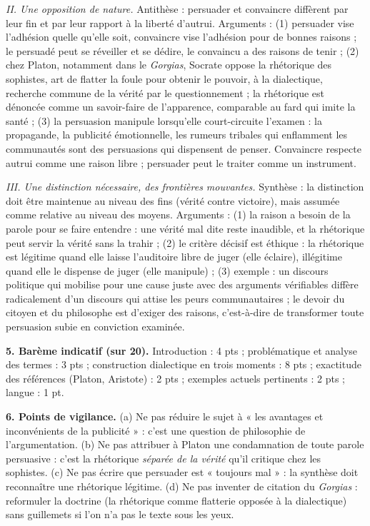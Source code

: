 \documentclass[11pt]{article}
\begin{document}
\begin{corrige}
\emph{II. Une opposition de nature.} Antithèse : persuader et convaincre diffèrent par leur fin et par leur rapport à la liberté d'autrui. Arguments : (1) persuader vise l'adhésion quelle qu'elle soit, convaincre vise l'adhésion pour de bonnes raisons ; le persuadé peut se réveiller et se dédire, le convaincu a des raisons de tenir ; (2) chez Platon, notamment dans le \emph{Gorgias}, Socrate oppose la rhétorique des sophistes, art de flatter la foule pour obtenir le pouvoir, à la dialectique, recherche commune de la vérité par le questionnement ; la rhétorique est dénoncée comme un savoir-faire de l'apparence, comparable au fard qui imite la santé ; (3) la persuasion manipule lorsqu'elle court-circuite l'examen : la propagande, la publicité émotionnelle, les rumeurs tribales qui enflamment les communautés sont des persuasions qui dispensent de penser. Convaincre respecte autrui comme une raison libre ; persuader peut le traiter comme un instrument.

\emph{III. Une distinction nécessaire, des frontières mouvantes.} Synthèse : la distinction doit être maintenue au niveau des fins (vérité contre victoire), mais assumée comme relative au niveau des moyens. Arguments : (1) la raison a besoin de la parole pour se faire entendre : une vérité mal dite reste inaudible, et la rhétorique peut servir la vérité sans la trahir ; (2) le critère décisif est éthique : la rhétorique est légitime quand elle laisse l'auditoire libre de juger (elle éclaire), illégitime quand elle le dispense de juger (elle manipule) ; (3) exemple : un discours politique qui mobilise pour une cause juste avec des arguments vérifiables diffère radicalement d'un discours qui attise les peurs communautaires ; le devoir du citoyen et du philosophe est d'exiger des raisons, c'est-à-dire de transformer toute persuasion subie en conviction examinée.

\textbf{5. Barème indicatif (sur 20).} Introduction : 4 pts ; problématique et analyse des termes : 3 pts ; construction dialectique en trois moments : 8 pts ; exactitude des références (Platon, Aristote) : 2 pts ; exemples actuels pertinents : 2 pts ; langue : 1 pt.

\textbf{6. Points de vigilance.} (a) Ne pas réduire le sujet à « les avantages et inconvénients de la publicité » : c'est une question de philosophie de l'argumentation. (b) Ne pas attribuer à Platon une condamnation de toute parole persuasive : c'est la rhétorique \emph{séparée de la vérité} qu'il critique chez les sophistes. (c) Ne pas écrire que persuader est « toujours mal » : la synthèse doit reconnaître une rhétorique légitime. (d) Ne pas inventer de citation du \emph{Gorgias} : reformuler la doctrine (la rhétorique comme flatterie opposée à la dialectique) sans guillemets si l'on n'a pas le texte sous les yeux.
\end{corrige}
\end{document}
